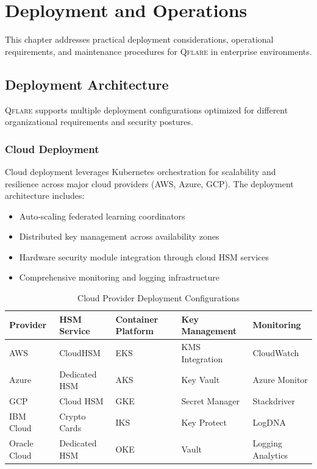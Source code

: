 \documentclass[12pt,a4paper,twoside]{book}
\newcommand{\qflare}{\textsc{Qflare}}
\begin{document}
\chapter{Deployment and Operations}
\label{ch:deployment}

This chapter addresses practical deployment considerations, operational requirements, and maintenance procedures for \qflare{} in enterprise environments.

\section{Deployment Architecture}
\label{sec:deployment-architecture}

\qflare{} supports multiple deployment configurations optimized for different organizational requirements and security postures.

\subsection{Cloud Deployment}
\label{subsec:cloud-deployment}

Cloud deployment leverages Kubernetes orchestration for scalability and resilience across major cloud providers (AWS, Azure, GCP). The deployment architecture includes:

\begin{itemize}
\item Auto-scaling federated learning coordinators
\item Distributed key management across availability zones
\item Hardware security module integration through cloud HSM services
\item Comprehensive monitoring and logging infrastructure
\end{itemize}

\begin{table}[htbp]
\centering
\caption{Cloud Provider Deployment Configurations}
\label{tab:cloud-deployment}
\begin{tabular}{@{}lllll@{}}
\toprule
Provider & HSM Service & Container Platform & Key Management & Monitoring \\
\midrule
AWS & CloudHSM & EKS & KMS Integration & CloudWatch \\
Azure & Dedicated HSM & AKS & Key Vault & Azure Monitor \\
GCP & Cloud HSM & GKE & Secret Manager & Stackdriver \\
IBM Cloud & Crypto Cards & IKS & Key Protect & LogDNA \\
Oracle Cloud & Dedicated HSM & OKE & Vault & Logging Analytics \\
\bottomrule
\end{tabular}
\end{table}
\end{document}
